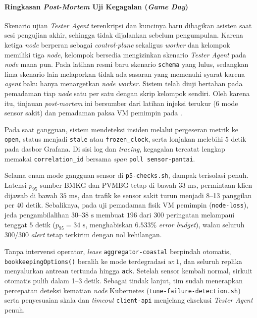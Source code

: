 \paragraph*{Ringkasan \textit{Post-Mortem} Uji Kegagalan (\textit{Game Day})}
Skenario ujian \textit{Tester Agent} terenkripsi dan kuncinya baru dibagikan asisten saat sesi pengujian akhir, sehingga tidak dijalankan sebelum pengumpulan. Karena ketiga \textit{node} berperan sebagai \textit{control-plane} sekaligus \textit{worker} dan kelompok memiliki tiga \textit{node}, kelompok bersedia mengizinkan skenario \textit{Tester Agent} pada \textit{node} mana pun. Pada latihan resmi baru skenario \texttt{schema} yang lulus, sedangkan lima skenario lain melaporkan tidak ada sasaran yang memenuhi syarat karena \textit{agent} baku hanya menargetkan \textit{node worker}. Sistem telah diuji bertahan pada pemadaman tiap \textit{node} satu per satu dengan skrip kelompok sendiri. Oleh karena itu, tinjauan \textit{post-mortem} ini bersumber dari latihan injeksi terukur  (6 mode sensor sakit) dan pemadaman paksa VM pemimpin pada .

Pada saat gangguan, sistem mendeteksi insiden melalui pergeseran metrik  ke \texttt{open}, status  menjadi \texttt{stale} atau \texttt{frozen\_clock}, serta lonjakan  melebihi $5\text{ detik}$ pada dasbor Grafana. Di sisi log dan \textit{tracing}, kegagalan tercatat lengkap memakai \texttt{correlation\_id} bersama \textit{span} \texttt{poll sensor-pantai}.

Selama enam mode gangguan sensor di \texttt{p5-checks.sh}, dampak terisolasi penuh. Latensi $p_{95}$ sumber BMKG dan PVMBG tetap di bawah $33\text{ ms}$, permintaan klien dijawab di bawah $35\text{ ms}$, dan trafik ke sensor sakit turun menjadi 8--13 panggilan per 40 detik. Sebaliknya, pada uji pemadaman fisik VM pemimpin (\texttt{node-loss}), jeda pengambilalihan $30$--$38\text{ s}$ membuat $196$ dari $300$ peringatan melampaui tenggat $5\text{ detik}$ ($p_{95} = 34\text{ s}$, menghabiskan $6.533\%$ \textit{error budget}), walau seluruh $300/300$ \textit{alert} tetap terkirim dengan nol kehilangan.

Tanpa intervensi operator, \textit{lease} \texttt{aggregator-\allowbreak coastal} berpindah otomatis, \texttt{bookkeeping\allowbreak Options()} beralih ke mode terdegradasi $w:1$, dan seluruh replika menyalurkan antrean tertunda hingga \texttt{ack}. Setelah sensor kembali normal, sirkuit otomatis pulih dalam 1--3 detik. Sebagai tindak lanjut, tim sudah menerapkan percepatan deteksi kematian \textit{node} Kubernetes (\texttt{tune-\allowbreak failure-\allowbreak detection.sh}) serta penyesuaian skala dan \textit{timeout} \texttt{client-api} menjelang eksekusi \textit{Tester Agent} penuh.
